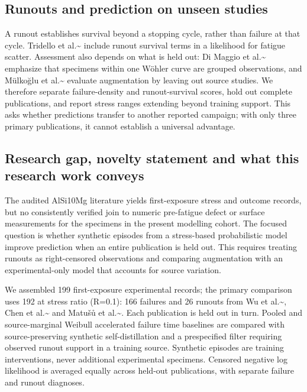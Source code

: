 \documentclass[12pt,a4paper]{article}
\begin{document}
\subsection{Runouts and prediction on unseen studies}

A runout establishes survival beyond a stopping cycle, rather than failure at that cycle. Tridello et al.\textasciitilde{}\cite{tridello2023a} include runout survival terms in a likelihood for fatigue scatter. Assessment also depends on what is held out: Di Maggio et al.\textasciitilde{}\cite{dimaggio2025} emphasize that specimens within one Wöhler curve are grouped observations, and Mülkoğlu et al.\textasciitilde{}\cite{mulkoglu2026} evaluate augmentation by leaving out source studies. We therefore separate failure-density and runout-survival scores, hold out complete publications, and report stress ranges extending beyond training support. This asks whether predictions transfer to another reported campaign; with only three primary publications, it cannot establish a universal advantage.

\subsection{Research gap, novelty statement and what this research work conveys}

The audited AlSi10Mg literature yields first-exposure stress and outcome records, but no consistently verified join to numeric pre-fatigue defect or surface measurements for the specimens in the present modelling cohort. The focused question is whether synthetic episodes from a stress-based probabilistic model improve prediction when an entire publication is held out. This requires treating runouts as right-censored observations and comparing augmentation with an experimental-only model that accounts for source variation.

We assembled 199 first-exposure experimental records; the primary comparison uses 192 at stress ratio (R=0.1): 166 failures and 26 runouts from Wu et al.\textasciitilde{}\cite{wu2021}, Chen et al.\textasciitilde{}\cite{chen2024} and Matušů et al.\textasciitilde{}\cite{matusu2026}. Each publication is held out in turn. Pooled and source-marginal Weibull accelerated failure time baselines are compared with source-preserving synthetic self-distillation and a prespecified filter requiring observed runout support in a training source. Synthetic episodes are training interventions, never additional experimental specimens. Censored negative log likelihood is averaged equally across held-out publications, with separate failure and runout diagnoses.
\end{document}
